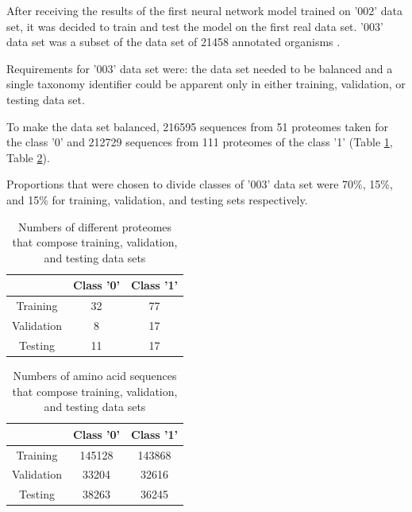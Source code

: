 \documentclass[12pt]{article}
\begin{document}
	After receiving the results of the first neural network model trained on 
	'002' data set, it was decided to train and test the model on the first 
	real data set. '003' data set was a subset of the data set of 21458 
	annotated organisms \cite{engqvist_martin_karl_magnus_2018_1175609}. 
	
	Requirements for '003' data set were: the data set needed to be balanced and a
	single taxonomy identifier could be apparent only in either training, validation,
	or testing data set. 
	
	To make the data set balanced, 216595 sequences from 51 proteomes taken 
	for the class '0' and 212729 sequences from 111 proteomes of the class '1' 
	(Table \ref{table:proteomes003}, Table \ref{table:sequences003}).

	Proportions that were chosen to divide classes of '003'
	data set were 70\%, 15\%, and 15\% for training, validation, and testing
	sets respectively.

	\begin{table}[h!]
		\caption{Numbers of different proteomes that compose training, 
		validation, and testing data sets}
		\vspace{0.2cm}
		\centering
		\begin{tabular}{ | c c c | }
			\hline
			& Class '0' & Class '1' \\
			\hline
			Training & 32 & 77 \\ 
			Validation & 8 & 17 \\
			Testing & 11 & 17 \\
			\hline   
		\end{tabular}
		\label{table:proteomes003}
	\end{table}

	\begin{table}[h!]
		\caption{Numbers of amino acid sequences that compose training, 
		validation, and testing data sets}
		\vspace{0.2cm}
		\centering
		\begin{tabular}{ | c c c | }
			\hline 
			& Class '0' & Class '1' \\
			\hline 
			Training & 145128 & 143868 \\
			Validation & 33204 & 32616 \\
			Testing & 38263 & 36245 \\
			\hline    
		\end{tabular}
		\label{table:sequences003}
	\end{table}
\end{document}
